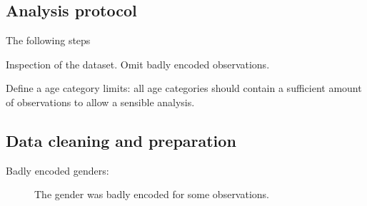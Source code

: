 \label{sec:Methods}

\subsection{Analysis protocol}

The following steps 
\begin{steps}
    \item \label{step:DataCleaning} Inspection of the dataset. Omit badly encoded observations.
    \item \label{step:AgeCategories} Define a age category limits: all age categories should contain a 
    sufficient amount of observations to allow a sensible analysis.
\end{steps}

\subsection{Data cleaning and preparation}
\begin{description}
    \item[Badly encoded genders:] The gender was badly encoded for some observations. 
\end{description} 
